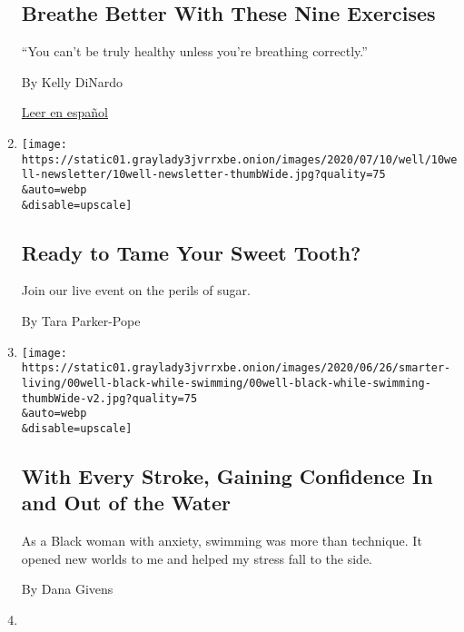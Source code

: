 \begin{enumerate}
  \hypertarget{breathe-better-with-these-nine-exercises}{%
  \subsection{Breathe Better With These Nine
  Exercises}\label{breathe-better-with-these-nine-exercises}}

  ``You can't be truly healthy unless you're breathing correctly.''

  By Kelly DiNardo

  \href{https://www.nytimes3xbfgragh.onion/es/2020/07/27/espanol/respira-mejor-con-estos-nueve-ejercicios.html}{Leer
  en español}
\item
  \href{/2020/07/09/well/eat/ready-to-tame-your-sweet-tooth.html}{}

  \texttt{[image: https://static01.graylady3jvrrxbe.onion/images/2020/07/10/well/10well-newsletter/10well-newsletter-thumbWide.jpg?quality=75\\\&auto=webp\\\&disable=upscale]}

  \hypertarget{ready-to-tame-your-sweet-tooth}{%
  \subsection{Ready to Tame Your Sweet
  Tooth?}\label{ready-to-tame-your-sweet-tooth}}

  Join our live event on the perils of sugar.

  By Tara Parker-Pope
\item
  \href{/2020/07/07/well/mind/swimming-anxiety-race-mental-health.html}{}

  \texttt{[image: https://static01.graylady3jvrrxbe.onion/images/2020/06/26/smarter-living/00well-black-while-swimming/00well-black-while-swimming-thumbWide-v2.jpg?quality=75\\\&auto=webp\\\&disable=upscale]}

  \hypertarget{with-every-stroke-gaining-confidence-in-and-out-of-the-water}{%
  \subsection{With Every Stroke, Gaining Confidence In and Out of the
  Water}\label{with-every-stroke-gaining-confidence-in-and-out-of-the-water}}

  As a Black woman with anxiety, swimming was more than technique. It
  opened new worlds to me and helped my stress fall to the side.

  By Dana Givens
\item
  \href{/2020/07/06/travel/tshiuetin-railroad-canada.html}{}


\end{enumerate}
